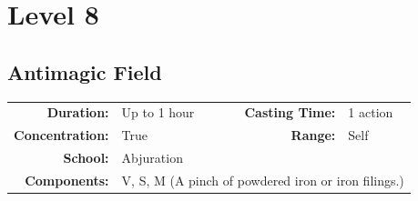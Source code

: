 \documentclass[12pt,showtrims]{memoir}
\begin{document}
\newpage
\chapter*{Level 8} 
\section*{Antimagic Field}

{
\small\centering\vspace{-6pt}
\begin{tabular}{rlrl}
\toprule

\textbf{Duration:} & Up to 1 hour &
\textbf{Casting Time:} & 1 action \\
\textbf{Concentration:} & True &
\textbf{Range:} & Self \\
\textbf{School:} & Abjuration \\
\textbf{Components:} & \multicolumn{3}{p{0.7\textwidth}}{V, S, M (A pinch of powdered iron or iron filings.)}\\

\bottomrule
\end{tabular}
}
\end{document}
